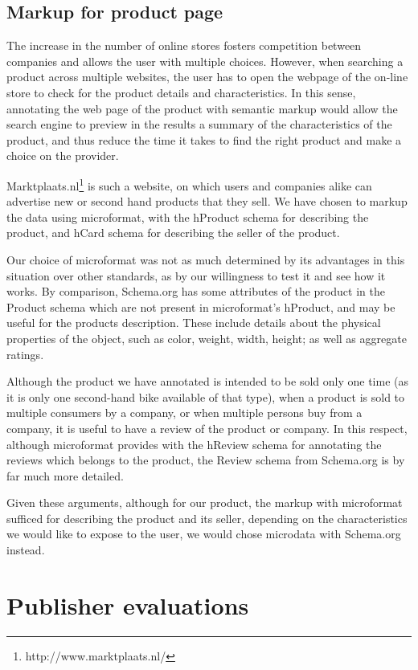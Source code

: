 \documentclass{acm_proc_10ptArticle-sp}
\begin{document}
\subsection{Markup for product page}

The increase in the number of online stores fosters competition between companies and allows the user with multiple choices. However, when searching a product across multiple websites, the user has to open the webpage of the on-line store to check for the product details and characteristics. In this sense, annotating the web page of the product with semantic markup would allow the search engine to preview in the results a summary of the characteristics of the product, and thus reduce the time it takes to find the right product and make a choice on the provider. 

Marktplaats.nl\footnote{http://www.marktplaats.nl/} is such a website, on which users and companies alike can advertise new or second hand products that they sell. We have chosen to markup the data using microformat, with the hProduct schema for describing the product, and hCard schema for describing the seller of the product. 

Our choice of microformat was not as much determined by its advantages in this situation over other standards, as by our willingness to test it and see how it works. By comparison, Schema.org has some attributes of the product in the Product schema which are not present in microformat's hProduct, and may be useful for the products description. These include details about the physical properties of the object, such as color, weight, width, height; as well as aggregate ratings.  

Although the product we have annotated is intended to be sold only one time (as it is only one second-hand bike available of that type), when a product is sold to multiple consumers by a company, or when multiple persons buy from a company, it is useful to have a review of the product or company. In this respect, although microformat provides with the hReview schema for annotating the reviews which belongs to the product, the Review schema from Schema.org is by far much more detailed. 

Given these arguments, although for our product, the markup with microformat sufficed for describing the product and its seller, depending on the characteristics we would like to expose to the user, we would chose microdata with Schema.org instead. 


\section{Publisher evaluations}
\end{document}
